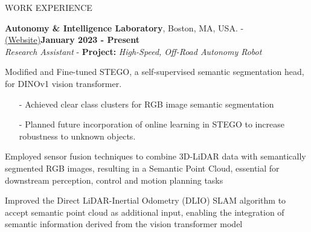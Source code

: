 \documentclass{resume} %
\begin{document}
    \begin{rSection}{WORK EXPERIENCE}
	\begin{rSubsectiond}{\textbf{Autonomy \& Intelligence Laboratory}, Boston, MA, USA. - \href{https://neu-autonomy.github.io/lab_website/team/}{(Website)}}{\textbf{January 2023 - Present} \\\textit{Research Assistant} - \textbf{Project:} \textit{High-Speed, Off-Road Autonomy Robot}}
	\item Modified and Fine-tuned STEGO, a self-supervised semantic segmentation head, for DINOv1 vision transformer.
	    \begin{itemize}
     \vspace{-2mm}
		\item[-] Achieved clear class clusters for RGB image semantic segmentation
  \vspace{-2mm}
		\item[-] Planned future incorporation of online learning in STEGO to increase robustness to unknown objects.
	    \end{itemize}
        \item Employed sensor fusion techniques to combine 3D-LiDAR data with semantically segmented RGB images, resulting in a Semantic Point Cloud, essential for downstream perception, control and motion planning tasks
        \item Improved the Direct LiDAR-Inertial Odometry (DLIO) SLAM algorithm to accept semantic point cloud as additional input, enabling the integration of semantic information derived from the vision transformer model

\end{rSubsectiond}
\end{rSection}
\end{document}
